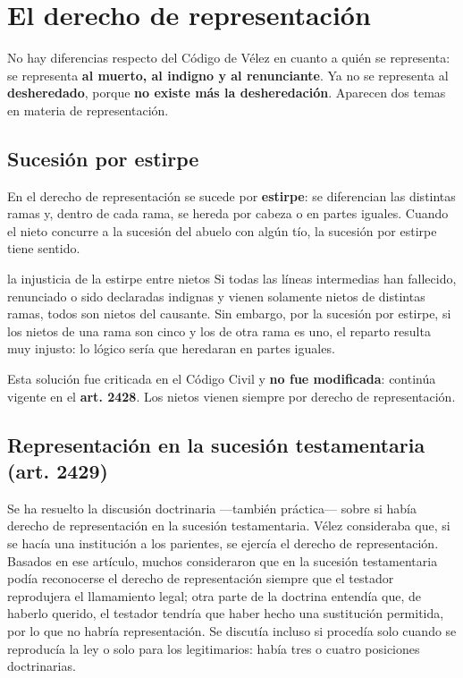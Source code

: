 \documentclass[12pt,oneside]{book}
\begin{document}
\section{El derecho de representación}

No hay diferencias respecto del Código de Vélez en cuanto a quién se representa: se representa \textbf{al muerto, al indigno y al renunciante}. Ya no se representa al \textbf{desheredado}, porque \textbf{no existe más la desheredación}. Aparecen dos temas en materia de representación.

\subsection{Sucesión por estirpe}

En el derecho de representación se sucede por \textbf{estirpe}: se diferencian las distintas ramas y, dentro de cada rama, se hereda por cabeza o en partes iguales. Cuando el nieto concurre a la sucesión del abuelo con algún tío, la sucesión por estirpe tiene sentido.

\begin{example}{la injusticia de la estirpe entre nietos}
Si todas las líneas intermedias han fallecido, renunciado o sido declaradas indignas y vienen solamente nietos de distintas ramas, todos son nietos del causante. Sin embargo, por la sucesión por estirpe, si los nietos de una rama son cinco y los de otra rama es uno, el reparto resulta muy injusto: lo lógico sería que heredaran en partes iguales.
\end{example}

Esta solución fue criticada en el Código Civil y \textbf{no fue modificada}: continúa vigente en el \textbf{art. 2428}. Los nietos vienen siempre por derecho de representación.

\subsection{Representación en la sucesión testamentaria (art. 2429)}

Se ha resuelto la discusión doctrinaria ---también práctica--- sobre si había derecho de representación en la sucesión testamentaria. Vélez consideraba que, si se hacía una institución a los parientes, se ejercía el derecho de representación. Basados en ese artículo, muchos consideraron que en la sucesión testamentaria podía reconocerse el derecho de representación siempre que el testador reprodujera el llamamiento legal; otra parte de la doctrina entendía que, de haberlo querido, el testador tendría que haber hecho una sustitución permitida, por lo que no habría representación. Se discutía incluso si procedía solo cuando se reproducía la ley o solo para los legitimarios: había tres o cuatro posiciones doctrinarias.
\end{document}

